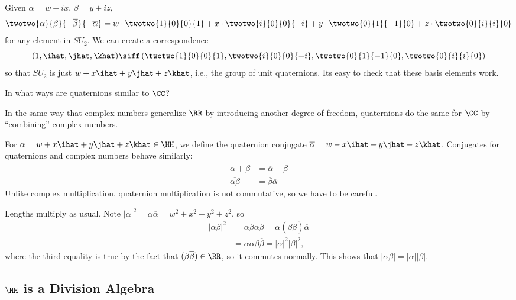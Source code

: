 Given $\alpha = w+ix$, $\beta = y+iz$,
\begin{align*}
    \twotwo{\alpha}{\beta}{-\overline{\beta}}{-\overline{\alpha}} = w\cdot \twotwo{1}{0}{0}{1}+x\cdot \twotwo{i}{0}{0}{-i}+y\cdot \twotwo{0}{1}{-1}{0}+z\cdot \twotwo{0}{i}{i}{0}
\end{align*}
for any element in $SU_2$. We can create a correspondence 
\[(1, \ihat, \jhat, \khat) \siff \left(\twotwo{1}{0}{0}{1}, \twotwo{i}{0}{0}{-i}, \twotwo{0}{1}{-1}{0}, \twotwo{0}{i}{i}{0}\right)\]
so that $SU_2$ is just $w+x\ihat+y\jhat+z\khat$, i.e., the group of unit quaternions. Its easy to check that these basis elements work. 

\begin{example}
\exlabel

In what ways are quaternions similar to $\CC$?
\end{example}

In the same way that complex numbers generalize $\RR$ by introducing another degree of freedom, quaternions do the same for $\CC$ by ``combining'' complex numbers. 

For $\alpha = w+x\ihat + y\jhat + z\khat\in \HH$, we define the \ac{quaternion conjugate} $\overline{\alpha} = w-x\ihat - y\jhat - z\khat$. Conjugates for quaternions and complex numbers behave similarly:
\begin{align*}
    \overline{\alpha+\beta} &= \overline{\alpha}+\overline{\beta} \\
    \overline{\alpha\beta}&=\overline{\beta}\overline{\alpha}
\end{align*}
Unlike complex multiplication, quaternion multiplication is not commutative, so we have to be careful. 

Lengths multiply as usual. Note $\vert \alpha\vert^2 = \alpha\overline{\alpha} = w^2+x^2+y^2+z^2$, so  \begin{align*}
    \vert\alpha\beta\vert^2 &= \alpha\beta\overline{\alpha\beta} = \alpha(\beta\overline{\beta})\overline{\alpha} \\ 
    &= \alpha\overline{\alpha}\beta\overline{\beta}=\vert \alpha\vert^2\vert\beta\vert^2,
\end{align*}
where the third equality is true by the fact that $(\beta\overline{\beta})\in \RR$, so it commutes normally. This shows that $\vert\alpha\beta\vert = \vert\alpha\vert\vert\beta\vert$. 

\subsection{$\HH$ is a Division Algebra}

